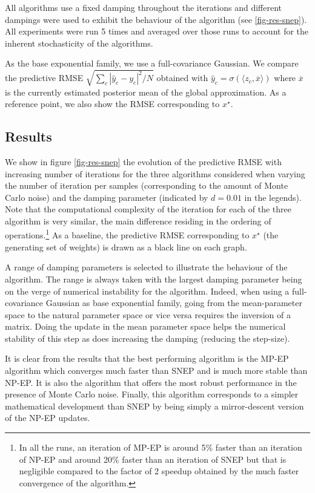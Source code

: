 All algorithms use a fixed damping throughout the iterations and different dampings were used to exhibit the behaviour of the algorithm (see \ref{fig-res-snep}). All experiments were run 5 times and averaged over those runs to account for the inherent stochasticity of the algorithms. 

As the base exponential family, we use a full-covariance Gaussian. We compare the predictive RMSE $\sqrt{\sum_c |\hat y_c-y_c|^2/N}$ obtained with $\hat y_c = \sigma(\langle z_c, \overline x\rangle)$ where $\overline x$ is the currently estimated posterior mean of the global approximation. As a reference point, we also show the RMSE corresponding to $x^\star$.

\subsection{Results}

We show in figure \ref{fig-res-snep} the evolution of the predictive RMSE with increasing number of iterations for the three algorithms considered when varying the number of iteration per samples (corresponding to the amount of Monte Carlo noise) and the damping parameter (indicated by $d=0.01$ in the legends). Note that the computational complexity of the iteration for each of the three algorithm is very similar, the main difference residing in the ordering of operations.\footnote{In all the runs, an iteration of MP-EP is around 5\% faster than an iteration of NP-EP and around 20\% faster than an iteration of SNEP but that is negligible compared to the factor of 2 speedup obtained by the much faster convergence of the algorithm.} As a baseline, the predictive RMSE corresponding to $x^{\star}$ (the generating set of weights) is drawn as a black line on each graph.

A range of damping parameters is selected to illustrate the behaviour of the algorithm. The range is always taken with the largest damping parameter being on the verge of numerical instability for the algorithm. Indeed, when using a full-covariance Gaussian as base exponential family, going from the mean-parameter space to the natural parameter space or vice versa requires the inversion of a matrix. Doing the update in the mean parameter space helps the numerical stability of this step as does increasing the damping (reducing the step-size).

It is clear from the results that the best performing algorithm is the MP-EP algorithm which converges much faster than SNEP and is much more stable than NP-EP. It is also the algorithm that offers the most robust performance in the presence of Monte Carlo noise. Finally, this algorithm corresponds to a simpler mathematical development than SNEP by being simply a mirror-descent version of the NP-EP updates. 

